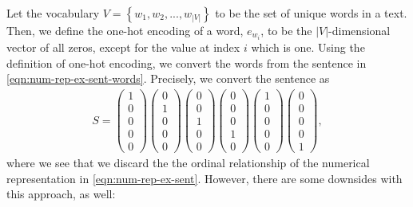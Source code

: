 Let the vocabulary $V = \left \{ w_1, w_2, ..., w_{|V|} \right \}$ to be the set of unique words in a text. Then, we define the one-hot encoding of a word, $e_{w_i}$, to be the $|V|$-dimensional vector of all zeros, except for the value at index $i$ which is one. Using the definition of one-hot encoding, we convert the words from the sentence in \cref{eqn:num-rep-ex-sent-words}. Precisely, we convert the sentence as
\begin{align}
    S = \begin{pmatrix}
    1\\
    0\\
    0\\
    0\\
    0
    \end{pmatrix}
    \begin{pmatrix}
    0\\
    1\\
    0\\
    0\\
    0
    \end{pmatrix}
    \begin{pmatrix}
    0\\
    0\\
    1\\
    0\\
    0
    \end{pmatrix}
    \begin{pmatrix}
    0\\
    0\\
    0\\
    1\\
    0
    \end{pmatrix}
    \begin{pmatrix}
    1\\
    0\\
    0\\
    0\\
    0
    \end{pmatrix}
    \begin{pmatrix}
    0\\
    0\\
    0\\
    0\\
    1
    \end{pmatrix},
    \label{eqn:one-hot-rep-ex-sent-words}
\end{align}
where we see that we discard the the ordinal relationship of the numerical representation in \cref{eqn:num-rep-ex-sent}. However, there are some downsides with this approach, as well:
